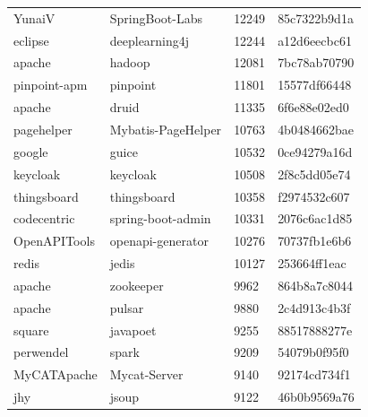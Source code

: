 \begin{longtable}{l | l | l | l}
    YunaiV              & SpringBoot-Labs           & 12249 & 85c7322b9d1a                            \\
    eclipse             & deeplearning4j            & 12244 & a12d6eecbc61                            \\
    apache              & hadoop                    & 12081 & 7bc78ab70790                            \\
    pinpoint-apm        & pinpoint                  & 11801 & 15577df66448                            \\
    apache              & druid                     & 11335 & 6f6e88e02ed0                            \\
    pagehelper          & Mybatis-PageHelper        & 10763 & 4b0484662bae                            \\
    google              & guice                     & 10532 & 0ce94279a16d                            \\
    keycloak            & keycloak                  & 10508 & 2f8c5dd05e74                            \\
    thingsboard         & thingsboard               & 10358 & f2974532c607                            \\
    codecentric         & spring-boot-admin         & 10331 & 2076c6ac1d85                            \\
    OpenAPITools        & openapi-generator         & 10276 & 70737fb1e6b6                            \\
    redis               & jedis                     & 10127 & 253664ff1eac                            \\
    apache              & zookeeper                 & 9962  & 864b8a7c8044                            \\
    apache              & pulsar                    & 9880  & 2c4d913c4b3f                            \\
    square              & javapoet                  & 9255  & 88517888277e                            \\
    perwendel           & spark                     & 9209  & 54079b0f95f0                            \\
    MyCATApache         & Mycat-Server              & 9140  & 92174cd734f1                            \\
    jhy                 & jsoup                     & 9122  & 46b0b9569a76                            \\

\end{longtable}
